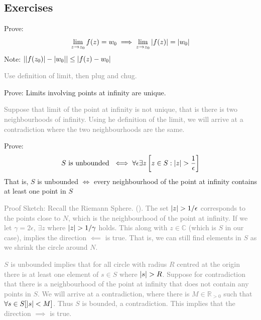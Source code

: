 \documentclass[12pt, english]{book}
\makeatletter
\renewenvironment{proof}[1][\proofname]{\par
	\pushQED{\qed}%
	\normalfont \topsep6\p@\@plus6\p@\relax
	\list{}{%
		\settowidth{\leftmargin}{\itshape\proofname:\hskip\labelsep}%
		\setlength{\labelwidth}{0pt}%
		\setlength{\itemindent}{-\leftmargin}%
	}%
	\item[\hskip\labelsep\itshape#1\@addpunct{:}]\ignorespaces
	}{ \popQED\endlist\@endpefalse}
\makeatother
\begin{document}
	\subsection{Exercises}
	
	\begin{example}
		Prove: $$ \lim_{z \rightarrow z_0} f(z) = w_0 \implies \lim_{z \rightarrow z_0} \abs{f(z)} = \abs{w_0}$$
		Note: $\abs{\abs{f(z_0)} - \abs{w_0}} \leq \abs{f(z) - w_0}$
	\end{example}
	\begin{proof}
		\textcolor{Grey}{Use definition of limit, then plug and chug.}
	\end{proof}
	
	\begin{example}
		Prove: Limits involving points at infinity are unique.
	\end{example}
	\begin{proof}
		\textcolor{Grey}{
		Suppose that limit of the point at infinity is not unique, that is there is two neighbourhoods of infinity. Using he definition of the limit, we will arrive at a contradiction where the two neighbourhoods are the same. 
		}
	\end{proof}
	
	\begin{example}
		Prove:
		\begin{align*}
			S \text{ is unbounded } \iff \forall \epsilon \exists z \left[ z \in S : \abs{z} > \frac{1}{\epsilon} \right]
		\end{align*}
		That is, $S$ is unbounded $\iff$ every neighbourhood of the point at infinity contains at least one point in $S$
	\end{example}
	\begin{proof}
		\textcolor{Grey}{
		Proof Sketch: 
		Recall the Riemann Sphere. (). The set $\abs{z} > 1/\epsilon$ corresponds to the points close to $N$, which is the neighbourhood of the point at infinity. If we let $\gamma = 2\epsilon$, $\exists z$ where $\abs{z} > 1/\gamma$ holds. This along with $z \in \mathbb{C}$ (which is $S$ in our case), implies the direction $\impliedby$ is true. That is, we can still find elements in $S$ as we shrink the circle around $N$. 
		}
		
		\textcolor{Grey}{
		$S$ is unbounded implies that for all circle with radius $R$ centred at the origin there is at least one element of $s \in S$ where $\abs{s} > R$. Suppose for contradiction that there is a neighbourhood of the point at infinity that does not contain any points in $S$. We will arrive at a contradiction, where there is $M \in \mathbb{R}_{>0}$ such that $\forall s \in S [\abs{s} < M]$. Thus $S$ is bounded, a contradiction. This implies that the direction $\implies$ is true. 
		}
	\end{proof}
\end{document}
